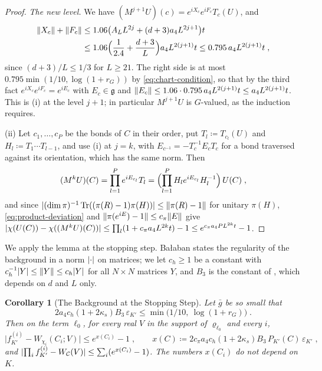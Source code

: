 \documentclass[11pt]{preprint}
\DeclarePairedDelimiter{\abs}{\lvert}{\rvert}
\DeclarePairedDelimiter{\norm}{\lVert}{\rVert}
\numberwithin{equation}{section}
\newtheorem{corollary}[theorem]{Corollary}
\theoremstyle{definition}
\theoremstyle{remark}
\theoremstyle{plain}
\begin{document}
\begin{proof}
\emph{The new level.} We have $(M^{j+1}U)(c) = e^{iX_c}e^{iF_c}T_c(U)$, and
\begin{equation}\label{eq:new-level}
\begin{split}
    \norm{X_c} + \norm{F_c} &\leq 1.06\bigl(A_LL^{2j} + (d + 3)a_4L^{2j+1}\bigr)t\\
    &\leq 1.06\Bigl(\frac{1}{2.4} + \frac{d + 3}{L}\Bigr)a_4L^{2(j+1)}t \leq 0.795\,a_4L^{2(j+1)}t\;,
\end{split}
\end{equation}
since $(d + 3)/L \leq 1/3$ for $L \geq 21$. The right side is at most $0.795\min(1/10, \log(1 + r_G))$ by \eqref{eq:chart-condition}, so that by the third fact $e^{iX_c}e^{iF_c} = e^{iE_c}$ with $E_c \in \mathfrak g$ and $\norm{E_c} \leq 1.06 \cdot 0.795\,a_4L^{2(j+1)}t \leq a_4L^{2(j+1)}t$. This is (i) at the level $j + 1$; in particular $M^{j+1}U$ is $G$-valued, as the induction requires.

(ii) Let $c_1, \dots, c_P$ be the bonds of $C$ in their order, put $T_l \coloneqq T_{c_l}(U)$ and $H_l \coloneqq T_1 \cdots T_{l-1}$, and use (i) at $j = k$, with $E_{c^{-1}} = -T_c^{-1}E_cT_c$ for a bond traversed against its orientation, which has the same norm. Then
\begin{equation}\label{eq:coarse-holonomy}
    (M^kU)(C) = \prod_{l=1}^{P}e^{iE_{c_l}}T_l = \Bigl(\prod_{l=1}^{P}H_le^{iE_{c_l}}H_l^{-1}\Bigr)\,U(C)\;,
\end{equation}
and since $\abs{(\dim\pi)^{-1}\operatorname{Tr}((\pi(R) - 1)\pi(H))} \leq \norm{\pi(R) - 1}$ for unitary $\pi(H)$, \eqref{eq:product-deviation} and $\norm{\pi(e^{iE}) - 1} \leq c_\pi\norm{E}$ give $\abs{\chi(U(C)) - \chi((M^kU)(C))} \leq \prod_l(1 + c_\pi a_4L^{2k}t) - 1 \leq e^{c_\pi a_4PL^{2k}t} - 1$.
\end{proof}

We apply the lemma at the stopping step. Ba{\l}aban states the regularity of the background in a norm $\abs{\cdot}$ on matrices; we let $c_h \geq 1$ be a constant with $c_h^{-1}\abs{Y} \leq \norm{Y} \leq c_h\abs{Y}$ for all $N \times N$ matrices $Y$, and $B_3$ is the constant of \cite[Theorem~1, p.~279]{BalabanVAR}, which depends on $d$ and $L$ only.

\begin{corollary}[The Background at the Stopping Step]\label{cor:background-stopping}
Let $\bar g$ be so small that
\begin{equation}\label{eq:chart-stopping}
    2a_4c_h(1 + 2\kappa_s)B_3\,\varepsilon_{K'} \leq \min\bigl(1/10,\ \log(1 + r_G)\bigr)\;.
\end{equation}
Then on the term $\ell_0$, for every real $V$ in the support of $\varrho_{\ell_0}$ and every $i$,
\begin{equation}\label{eq:background-stopping}
    \bigl\lvert f^{(i)}_{K'} - W_{\chi_i}(C_i; V)\bigr\rvert \leq e^{x(C_i)} - 1\;,
    \qquad
    x(C) \coloneqq 2c_\pi a_4c_h(1 + 2\kappa_s)B_3\,P_{K'}(C)\,\varepsilon_{K'}\;,
\end{equation}
and $\abs{\prod_if^{(i)}_{K'} - W_{\mathcal C}(V)} \leq \sum_i(e^{x(C_i)} - 1)$. The numbers $x(C_i)$ do not depend on $K$.
\end{corollary}
\end{document}
